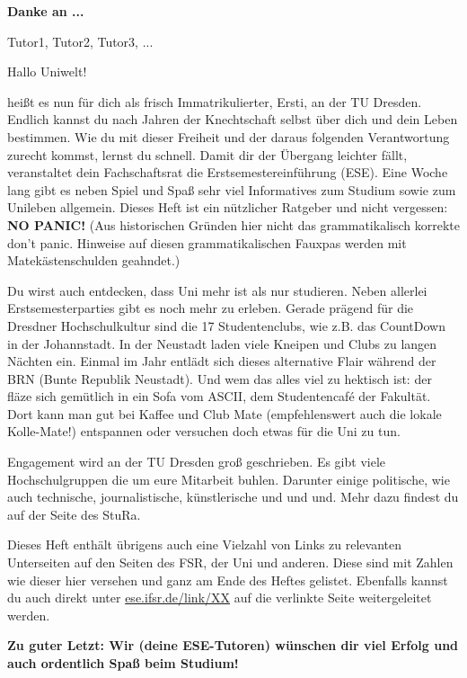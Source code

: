 \textbf{Danke an ...}

Tutor1, Tutor2, Tutor3, ...


Hallo Uniwelt!

heißt es nun für dich als frisch Immatrikulierter, Ersti, an der TU Dresden. 
Endlich kannst du nach Jahren der Knechtschaft selbst über dich und dein Leben bestimmen. 
Wie du mit dieser Freiheit und der daraus folgenden Verantwortung zurecht kommst, lernst du schnell. 
Damit dir der Übergang leichter fällt, veranstaltet dein Fachschaftsrat die Erstsemestereinführung (ESE). 
Eine Woche lang gibt es neben Spiel und Spaß sehr viel Informatives zum Studium sowie zum Unileben allgemein. 
Dieses Heft ist ein nützlicher Ratgeber und nicht vergessen: 
\textbf{NO PANIC!} (Aus historischen Gründen hier nicht das grammatikalisch korrekte \glqq don't panic\grqq. Hinweise auf diesen grammatikalischen Fauxpas werden mit Matekästenschulden geahndet.)

Du wirst auch entdecken, dass Uni mehr ist als nur studieren. 
Neben allerlei Erstsemesterparties gibt es noch mehr zu erleben. 
Gerade prägend für die Dresdner Hochschulkultur sind die 17 Studentenclubs, wie z.B. das CountDown in der Johannstadt. 
In der Neustadt laden viele Kneipen und Clubs zu langen Nächten ein. 
Einmal im Jahr entlädt sich dieses alternative Flair während der BRN (Bunte Republik Neustadt). 
Und wem das alles viel zu hektisch ist: der fläze sich gemütlich in ein Sofa vom ASCII, dem Studentencafé der Fakultät. 
Dort kann man gut bei Kaffee und Club Mate (empfehlenswert auch die lokale Kolle-Mate!) entspannen oder versuchen doch etwas für die Uni zu tun.

Engagement wird an der TU Dresden groß geschrieben. 
Es gibt viele Hochschulgruppen die um eure Mitarbeit buhlen. 
Darunter einige politische, wie auch technische, journalistische, künstlerische und und und. Mehr dazu findest du auf der Seite des StuRa.

Dieses Heft enthält übrigens auch eine Vielzahl von Links zu relevanten Unterseiten auf den Seiten des FSR, der Uni und anderen. 
Diese sind mit Zahlen wie dieser hier \link{\textcolor{red}{NONE}} versehen und ganz am Ende des Heftes gelistet. Ebenfalls kannst du auch direkt unter \url{ese.ifsr.de/link/XX} auf die verlinkte Seite weitergeleitet werden.

\textbf{Zu guter Letzt: Wir (deine ESE-Tutoren) wünschen dir viel Erfolg und auch ordentlich Spaß beim Studium!}


